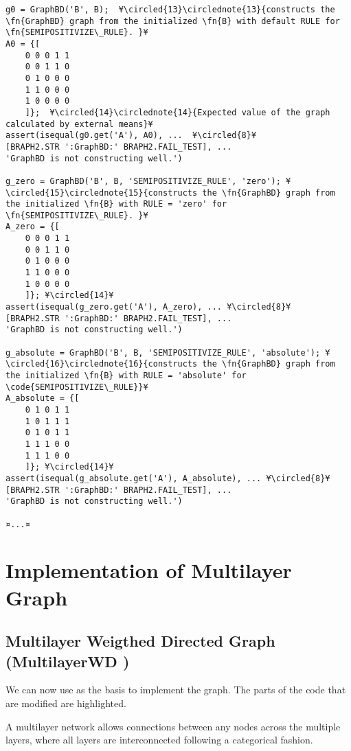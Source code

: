 \documentclass{tufte-handout}
\begin{document}
\begin{lstlisting}
g0 = GraphBD('B', B);  ¥\circled{13}\circlednote{13}{constructs the \fn{GraphBD} graph from the initialized \fn{B} with default RULE for \fn{SEMIPOSITIVIZE\_RULE}. }¥
A0 = {[
	0 0 0 1 1
	0 0 1 1 0
	0 1 0 0 0
	1 1 0 0 0
	1 0 0 0 0
	]};  ¥\circled{14}\circlednote{14}{Expected value of the graph calculated by external means}¥
assert(isequal(g0.get('A'), A0), ...  ¥\circled{8}¥
[BRAPH2.STR ':GraphBD:' BRAPH2.FAIL_TEST], ...
'GraphBD is not constructing well.')

g_zero = GraphBD('B', B, 'SEMIPOSITIVIZE_RULE', 'zero'); ¥\circled{15}\circlednote{15}{constructs the \fn{GraphBD} graph from the initialized \fn{B} with RULE = 'zero' for \fn{SEMIPOSITIVIZE\_RULE}. }¥
A_zero = {[
	0 0 0 1 1
	0 0 1 1 0
	0 1 0 0 0
	1 1 0 0 0
	1 0 0 0 0
	]}; ¥\circled{14}¥
assert(isequal(g_zero.get('A'), A_zero), ... ¥\circled{8}¥
[BRAPH2.STR ':GraphBD:' BRAPH2.FAIL_TEST], ...
'GraphBD is not constructing well.')

g_absolute = GraphBD('B', B, 'SEMIPOSITIVIZE_RULE', 'absolute'); ¥\circled{16}\circlednote{16}{constructs the \fn{GraphBD} graph from the initialized \fn{B} with RULE = 'absolute' for \code{SEMIPOSITIVIZE\_RULE}}¥
A_absolute = {[
	0 1 0 1 1
	1 0 1 1 1
	0 1 0 1 1
	1 1 1 0 0
	1 1 1 0 0
	]}; ¥\circled{14}¥
assert(isequal(g_absolute.get('A'), A_absolute), ... ¥\circled{8}¥
[BRAPH2.STR ':GraphBD:' BRAPH2.FAIL_TEST], ...
'GraphBD is not constructing well.')

¤...¤
\end{lstlisting}

\clearpage
\section{Implementation of Multilayer Graph}

\subsection{Multilayer Weigthed Directed Graph (MultilayerWD )}

We can now use  as the basis to implement the  graph. The parts of the code that are modified are highlighted.

A multilayer network allows connections between any nodes across the multiple layers, where all layers are interconnected following a categorical fashion.
\end{document}
